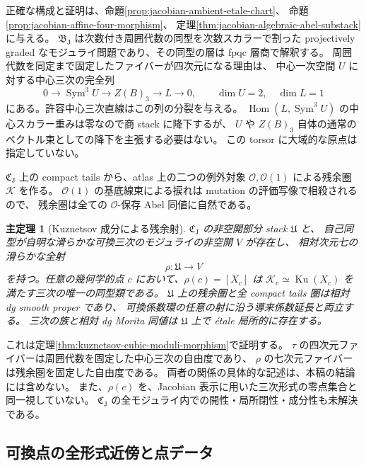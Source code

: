 \documentclass[11pt,a4paper]{ltjsarticle}
\numberwithin{equation}{section}
\newtheorem{maintheorem}{主定理}
\newcommand{\Sym}{\operatorname{Sym}}
\newcommand{\Hom}{\operatorname{Hom}}
\begin{document}
正確な構成と証明は、命題\ref{prop:jacobian-ambient-etale-chart}、
命題\ref{prop:jacobian-affine-four-morphism}、
定理\ref{thm:jacobian-algebraic-abel-substack}に与える。
$\mathfrak B_{\mathrm J}$ は次数付き周囲代数の同型を次数スカラーで割った
projectively graded なモジュライ問題であり、その同型の層は fpqc 層商で解釈する。
周囲代数を同定まで固定したファイバーが四次元になる理由は、
中心一次空間 $U$ に対する中心三次の完全列
\[
 0\longrightarrow\Sym^3 U\longrightarrow Z(B)_3\longrightarrow L\longrightarrow0,
 \qquad \dim U=2,\quad\dim L=1
\]
にある。許容中心三次直線はこの列の分裂を与える。
$\Hom(L,\Sym^3 U)$ の中心スカラー重みは零なので商 stack に降下するが、
$U$ や $Z(B)_3$ 自体の通常のベクトル束としての降下を主張する必要はない。
この torsor に大域的な原点は指定していない。

$\mathfrak C_{\mathrm J}$ 上の compact tails から、atlas 上の二つの例外対象
$\mathcal O,\mathcal O(1)$ による残余圏 $\mathcal K$ を作る。
$\mathcal O(1)$ の基底線束による捩れは mutation の評価写像で相殺されるので、
残余圏は全ての $\mathcal O$-保存 Abel 同値に自然である。

\begin{maintheorem}[Kuznetsov 成分による残余射]\label{thm:intro-residual}
$\mathfrak C_{\mathrm J}$ の非空開部分 stack $\mathfrak U$ と、
自己同型が自明な滑らかな可換三次のモジュライの非空開 $V$ が存在し、
相対次元七の滑らかな全射
\[
 \rho:\mathfrak U\longrightarrow V
\]
を持つ。任意の幾何学的点 $c$ において、$\rho(c)=[X_c]$ は
$\mathcal K_c\simeq\operatorname{Ku}(X_c)$ を満たす三次の唯一の同型類である。
$\mathfrak U$ 上の残余圏と全 compact tails 圏は相対 dg smooth proper であり、
可換係数環の任意の射に沿う導来係数延長と両立する。
三次の族と相対 dg Morita 同値は $\mathfrak U$ 上で étale 局所的に存在する。
\end{maintheorem}

これは定理\ref{thm:kuznetsov-cubic-moduli-morphism}で証明する。
$\tau$ の四次元ファイバーは周囲代数を固定した中心三次の自由度であり、
$\rho$ の七次元ファイバーは残余圏を固定した自由度である。
両者の関係の具体的な記述は、本稿の結論には含めない。
また、$\rho(c)$ を、Jacobian 表示に用いた三次形式の零点集合と同一視していない。
$\mathfrak C_{\mathrm J}$ の全モジュライ内での開性・局所閉性・成分性も未解決である。

\subsection{可換点の全形式近傍と点データ}
\end{document}
